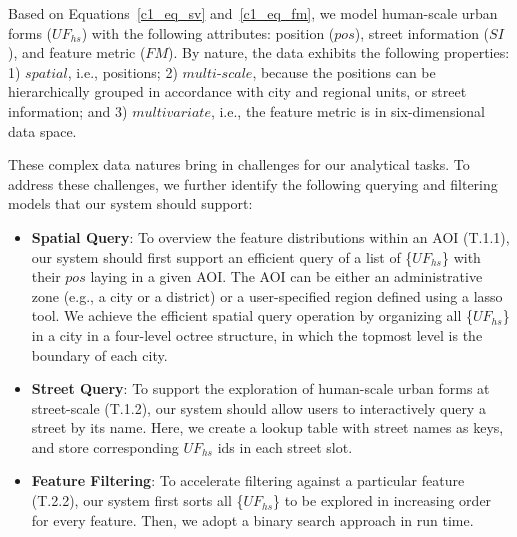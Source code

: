 Based on Equations~\ref{c1_eq_sv} and~\ref{c1_eq_fm}, we model human-scale urban forms ($UF_{hs}$) with the following attributes: position ($pos$), street information ($SI$), and feature metric ($FM$).
By nature, the data exhibits the following properties: 
1) $spatial$, i.e., positions;
2) $multi$-$scale$, because the positions can be hierarchically grouped in accordance with city and regional units, or street information;
and 3) $multivariate$, i.e., the feature metric is in six-dimensional data space.

These complex data natures bring in challenges for our analytical tasks.
To address these challenges, we further identify the following querying and filtering models that our system should support:

\vspace*{-2mm}
\begin{itemize}

\item
\textbf{Spatial Query}:
To overview the feature distributions within an AOI (T.1.1), our system should first support an efficient query of a list of \{$UF_{hs}$\} with their $pos$ laying in a given AOI.
The AOI can be either an administrative zone (e.g., a city or a district) or a user-specified region defined using a lasso tool.
We achieve the efficient spatial query operation by organizing all \{$UF_{hs}$\} in a city in a four-level octree structure, in which the topmost level is the boundary of each city.

\vspace*{-2mm}
\item
\textbf{Street Query}:
To support the exploration of human-scale urban forms at street-scale (T.1.2), our system should allow users to interactively query a street by its name.
Here, we create a lookup table with street names as keys, and store corresponding $UF_{hs}$ ids in each street slot.

\vspace*{-2mm}
\item
\textbf{Feature Filtering}:
To accelerate filtering against a particular feature (T.2.2), our system first sorts all \{$UF_{hs}$\} to be explored in increasing order for every feature.
Then, we adopt a binary search approach in run time.

\end{itemize}

